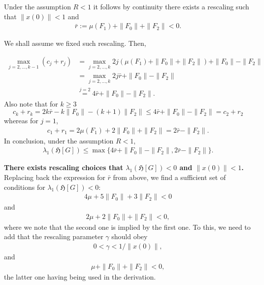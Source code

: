 \documentclass[superscriptaddress,onecolumn,nofootinbib,longbibliography,a4paper,accepted=2026-09-29]{quantumarticle}
\theoremstyle{plain}
\theoremstyle{definition}
\numberwithin{thm}{section}
\numberwithin{assumption}{section}
\numberwithin{lemma}{section}
\numberwithin{prop}{section}
\numberwithin{cor}{section}
\numberwithin{definition}{section}
\numberwithin{rmk}{section}
\numberwithin{equation}{section}
\newcommand{\hh}[1]{\ensuremath{\mathfrak{H}\left[#1\right]}}
\begin{document}
Under the assumption $R<1$ it follows by continuity there exists a rescaling such that \mbox{$\| x(0)\| <1$} and
\begin{align}
\label{eq:littler}
   \bar{r} := \mu(F_1) + \| F_0\| + \| F_2\| < 0.
\end{align} 

We shall assume we fixed such rescaling. Then, 

\begin{align}
 \max_{j=2, \dots, k-1}  (c_j + r_j) & =  \max_{j=2, \dots, k}  2j( \mu(F_1) + \| F_0\| + \| F_2 \|) +  \| F_0\| - \| F_2 \| \\
 & =  \max_{j=2, \dots, k}  2j \bar{r} +  \| F_0\| - \| F_2 \|
 \\
 & \stackrel{j=2}{=} 4 \bar{r} + \| F_0\| - \| F_2\|. 
\end{align}
Also note that for $k\geq 3$
\begin{equation}
    c_{k} + r_{k} = 2 k \bar{r} - k\| F_0\|
    -    
    (k+1)\| F_2\| \leq 4 \bar{r} + \| F_0\| - \| F_2\| = c_2 + r_2
\end{equation}
whereas for $j=1$,
\begin{align}
    c_1 + r_1 = 2\mu(F_1) + 2\| F_0\| + \| F_2 \| = 2 \bar{r} - \| F_2\|. 
\end{align}
In conclusion, under the assumption $R<1$,
\begin{align}
\label{eq:ReGmaxeigenvaluemaxbound}
     \lambda_1(\hh{G}) \leq \max \{ 4 \bar{r} + \| F_0\| - \| F_2\|, 2 \bar{r} - \| F_2\|\}.
\end{align}

\bigskip

\textbf{There exists rescaling choices that  $\lambda_1(\hh{G})<0$ and $\|x(0)\|<1$.} Replacing back the expression for $\bar{r}$ from above, we find a sufficient set of conditions for \mbox{$\lambda_1(\hh{G})<0$}:
\begin{align}
    4 \mu + 5 \| F_0\| + 3 \| F_2\| <0 
\end{align}
and
\begin{align}
       2 \mu + 2 \| F_0\| +  \| F_2\| <0, 
\end{align}
where we note that the second one is implied by the first one. To this, we need to add that the rescaling parameter $\gamma$ should obey
\begin{align}
   0< \gamma < 1/ \| x(0)\|,
\end{align}
and 
\begin{align}
    \mu + \| F_0\| + \|F_2\| < 0,
\end{align}
the latter one having being used in the derivation.
\end{document}
